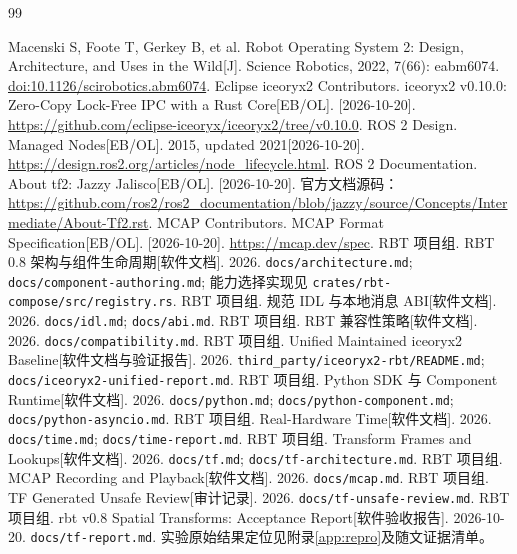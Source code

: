 \documentclass[UTF8,fontset=none,zihao=-4,a4paper]{ctexart}
\newcommand{\src}[1]{\nolinkurl{#1}}
\begin{document}
\FloatBarrier
\begin{thebibliography}{99}
\fontsize{9.5pt}{12pt}\selectfont\raggedright\setlength{\itemsep}{2pt}\setlength{\parskip}{0pt}
 Macenski S, Foote T, Gerkey B, et al. Robot Operating System 2: Design, Architecture, and Uses in the Wild[J]. Science Robotics, 2022, 7(66): eabm6074. \href{https://doi.org/10.1126/scirobotics.abm6074}{doi:10.1126/scirobotics.abm6074}.
 Eclipse iceoryx2 Contributors. iceoryx2 v0.10.0: Zero-Copy Lock-Free IPC with a Rust Core[EB/OL]. [2026-10-20]. \url{https://github.com/eclipse-iceoryx/iceoryx2/tree/v0.10.0}.
 ROS 2 Design. Managed Nodes[EB/OL]. 2015, updated 2021[2026-10-20]. \url{https://design.ros2.org/articles/node_lifecycle.html}.
 ROS 2 Documentation. About tf2: Jazzy Jalisco[EB/OL]. [2026-10-20]. 官方文档源码：\url{https://github.com/ros2/ros2_documentation/blob/jazzy/source/Concepts/Intermediate/About-Tf2.rst}.
 MCAP Contributors. MCAP Format Specification[EB/OL]. [2026-10-20]. \url{https://mcap.dev/spec}.
 RBT 项目组. RBT 0.8 架构与组件生命周期[软件文档]. 2026. \src{docs/architecture.md}; \src{docs/component-authoring.md}; 能力选择实现见 \src{crates/rbt-compose/src/registry.rs}.
 RBT 项目组. 规范 IDL 与本地消息 ABI[软件文档]. 2026. \src{docs/idl.md}; \src{docs/abi.md}.
 RBT 项目组. RBT 兼容性策略[软件文档]. 2026. \src{docs/compatibility.md}.
 RBT 项目组. Unified Maintained iceoryx2 Baseline[软件文档与验证报告]. 2026. \src{third_party/iceoryx2-rbt/README.md}; \src{docs/iceoryx2-unified-report.md}.
 RBT 项目组. Python SDK 与 Component Runtime[软件文档]. 2026. \src{docs/python.md}; \src{docs/python-component.md}; \src{docs/python-asyncio.md}.
 RBT 项目组. Real-Hardware Time[软件文档]. 2026. \src{docs/time.md}; \src{docs/time-report.md}.
 RBT 项目组. Transform Frames and Lookups[软件文档]. 2026. \src{docs/tf.md}; \src{docs/tf-architecture.md}.
 RBT 项目组. MCAP Recording and Playback[软件文档]. 2026. \src{docs/mcap.md}.
 RBT 项目组. TF Generated Unsafe Review[审计记录]. 2026. \src{docs/tf-unsafe-review.md}.
 RBT 项目组. rbt v0.8 Spatial Transforms: Acceptance Report[软件验收报告]. 2026-10-20. \src{docs/tf-report.md}. 实验原始结果定位见附录\ref{app:repro}及随文证据清单。
\end{thebibliography}
\end{document}
